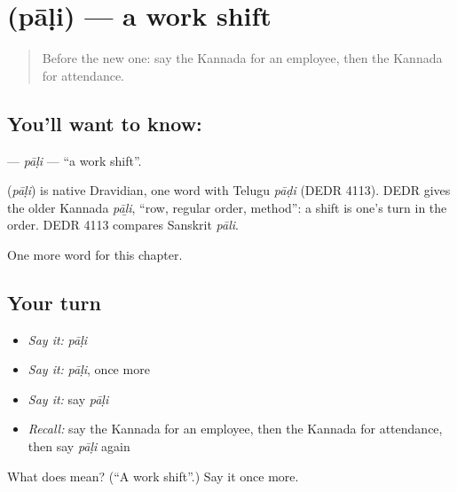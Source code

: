 \section[\texorpdfstring{\kn{ಪಾಳಿ} (pāḷi)}{ಪಾಳಿ (pāḷi)}]{ (pāḷi) — a work shift}

\label{lesson:KA-C234-pali}



\begin{quote}
Before the new one: say the Kannada for an employee, then the Kannada for attendance.
\end{quote}

\subsection*{You'll want to know: }
\textbf{} — \emph{pāḷi} — \textquotedblleft{}a work shift\textquotedblright{}.

\begin{cousinweb}
\textbf{} (\emph{pāḷi}) is native Dravidian, one word with Telugu \emph{pāḍi} (DEDR 4113). DEDR gives the older Kannada \emph{pāḻi}, \textquotedblleft{}row, regular order, method\textquotedblright{}: a shift is one's turn in the order. DEDR 4113 compares Sanskrit \emph{pāli}.
\end{cousinweb}

\begin{grammarlens}[title={What you've built}]
One more word for this chapter.
\end{grammarlens}

\subsection*{Your turn}
\begin{itemize}
\raggedright
  \item \emph{Say it:} \emph{pāḷi}
  \item \emph{Say it:} \emph{pāḷi}, once more
  \item \emph{Say it:} say \emph{pāḷi}
  \item \emph{Recall:} say the Kannada for an employee, then the Kannada for attendance, then say \emph{pāḷi} again
\end{itemize}

\begin{tcolorbox}[breakable,colback=teal!4,colframe=teal!35!black,title={Before you move on}]
What does  mean? (\textquotedblleft{}A work shift\textquotedblright{}.) Say it once more.
\end{tcolorbox}
